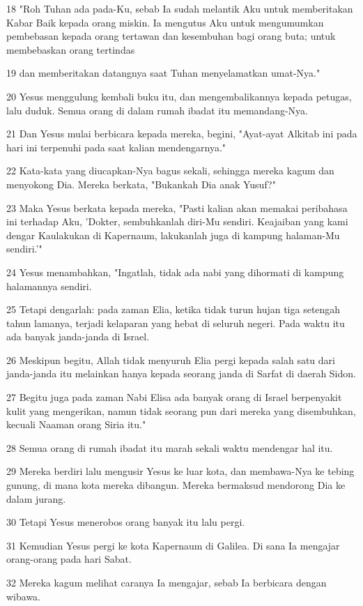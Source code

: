 \par 18 "Roh Tuhan ada pada-Ku, sebab Ia sudah melantik Aku untuk memberitakan Kabar Baik kepada orang miskin. Ia mengutus Aku untuk mengumumkan pembebasan kepada orang tertawan dan kesembuhan bagi orang buta; untuk membebaskan orang tertindas
\par 19 dan memberitakan datangnya saat Tuhan menyelamatkan umat-Nya."
\par 20 Yesus menggulung kembali buku itu, dan mengembalikannya kepada petugas, lalu duduk. Semua orang di dalam rumah ibadat itu memandang-Nya.
\par 21 Dan Yesus mulai berbicara kepada mereka, begini, "Ayat-ayat Alkitab ini pada hari ini terpenuhi pada saat kalian mendengarnya."
\par 22 Kata-kata yang diucapkan-Nya bagus sekali, sehingga mereka kagum dan menyokong Dia. Mereka berkata, "Bukankah Dia anak Yusuf?"
\par 23 Maka Yesus berkata kepada mereka, "Pasti kalian akan memakai peribahasa ini terhadap Aku, 'Dokter, sembuhkanlah diri-Mu sendiri. Keajaiban yang kami dengar Kaulakukan di Kapernaum, lakukanlah juga di kampung halaman-Mu sendiri.'"
\par 24 Yesus menambahkan, "Ingatlah, tidak ada nabi yang dihormati di kampung halamannya sendiri.
\par 25 Tetapi dengarlah: pada zaman Elia, ketika tidak turun hujan tiga setengah tahun lamanya, terjadi kelaparan yang hebat di seluruh negeri. Pada waktu itu ada banyak janda-janda di Israel.
\par 26 Meskipun begitu, Allah tidak menyuruh Elia pergi kepada salah satu dari janda-janda itu melainkan hanya kepada seorang janda di Sarfat di daerah Sidon.
\par 27 Begitu juga pada zaman Nabi Elisa ada banyak orang di Israel berpenyakit kulit yang mengerikan, namun tidak seorang pun dari mereka yang disembuhkan, kecuali Naaman orang Siria itu."
\par 28 Semua orang di rumah ibadat itu marah sekali waktu mendengar hal itu.
\par 29 Mereka berdiri lalu mengusir Yesus ke luar kota, dan membawa-Nya ke tebing gunung, di mana kota mereka dibangun. Mereka bermaksud mendorong Dia ke dalam jurang.
\par 30 Tetapi Yesus menerobos orang banyak itu lalu pergi.
\par 31 Kemudian Yesus pergi ke kota Kapernaum di Galilea. Di sana Ia mengajar orang-orang pada hari Sabat.
\par 32 Mereka kagum melihat caranya Ia mengajar, sebab Ia berbicara dengan wibawa.

